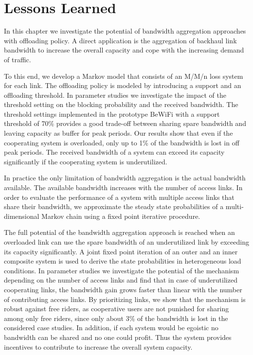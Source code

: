 \section{Lessons Learned}\label{sec:aggregation:lessonslearned}
In this chapter we investigate the potential of bandwidth aggregation approaches with offloading policy.
A direct application is the aggregation of backhaul link bandwidth to increase the overall capacity and cope with the increasing demand of traffic. %

To this end, we develop a Markov model that consists of an M/M/n loss system for each link.
The offloading policy is modeled by introducing a support and an offloading threshold.
In parameter studies we investigate the impact of the threshold setting on the blocking probability and the received bandwidth.
The threshold settings implemented in the prototype BeWiFi with a support threshold of 70\% provides a good trade-off between sharing spare bandwidth and leaving capacity as buffer for peak periods.
Our results show that even if the cooperating system is overloaded, only up to 1\% of the bandwidth is lost in off peak periods.
The received bandwidth of a system can exceed its capacity significantly if the cooperating system is underutilized.

In practice the only limitation of bandwidth aggregation is the actual bandwidth available. The available bandwidth increases with the number of access links.
In order to evaluate the performance of a system with multiple access links that share their bandwidth, we approximate the steady state probabilities of a multi-dimensional Markov chain using a fixed point iterative procedure.

The full potential of the bandwidth aggregation approach is reached when an overloaded link can use the spare bandwidth of an underutilized link by exceeding its capacity significantly.
A joint fixed point iteration of an outer and an inner composite system is used to derive the state probabilities in heterogeneous load conditions.
In parameter studies we investigate the potential of the mechanism depending on the number of access links and find that in case of underutilized cooperating links, the bandwidth gain grows faster than linear with the number of contributing access links.
By prioritizing links, we show that the mechanism is robust against free riders, as cooperative users are not punished for sharing among only free riders, since only about 3\% of the bandwidth is lost in the considered case studies.
In addition, if each system would be egoistic no bandwidth can be shared and no one could profit.
Thus the system provides incentives to contribute to increase the overall system capacity.

